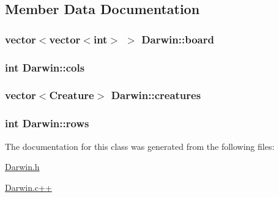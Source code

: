 \subsection{Member Data Documentation}
\hypertarget{classDarwin_ab50b1d6994182da19b2cedbfdaf5d620}{
\subsubsection[{board}]{\setlength{\rightskip}{0pt plus 5cm}vector$<$vector$<$int$>$ $>$ Darwin\-::board\hspace{0.3cm}{\ttfamily [private]}}}\label{classDarwin_ab50b1d6994182da19b2cedbfdaf5d620}
\hypertarget{classDarwin_a6fc008980a5075ae9809ea59c9420f25}{
\subsubsection[{cols}]{\setlength{\rightskip}{0pt plus 5cm}int Darwin\-::cols\hspace{0.3cm}{\ttfamily [private]}}}\label{classDarwin_a6fc008980a5075ae9809ea59c9420f25}
\hypertarget{classDarwin_a978b043fc31166158147808b599f2cc3}{
\subsubsection[{creatures}]{\setlength{\rightskip}{0pt plus 5cm}vector$<${\bf Creature}$>$ Darwin\-::creatures\hspace{0.3cm}{\ttfamily [private]}}}\label{classDarwin_a978b043fc31166158147808b599f2cc3}
\hypertarget{classDarwin_a368dba95a0532123e3bc34896bf292ca}{
\subsubsection[{rows}]{\setlength{\rightskip}{0pt plus 5cm}int Darwin\-::rows\hspace{0.3cm}{\ttfamily [private]}}}\label{classDarwin_a368dba95a0532123e3bc34896bf292ca}


The documentation for this class was generated from the following files\-:\begin{DoxyCompactItemize}
\item 
\hyperlink{Darwin_8h}{Darwin.\-h}\item 
\hyperlink{Darwin_8c_09_09}{Darwin.\-c++}\end{DoxyCompactItemize}
